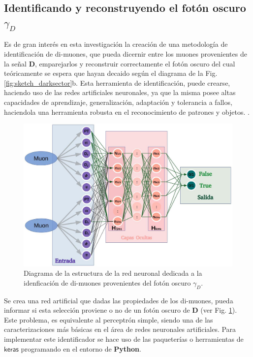 \subsection{Identificando y reconstruyendo el fotón oscuro $\gamma_D$}

Es de gran interés en esta investigación la creación de una metodología de identificación de di-muones, que pueda dicernir entre los muones provenientes de la señal \MSSM\textbf{D}, emparejarlos y reconstruir correctamente el fotón oscuro del cual teóricamente se espera que hayan decaido según el diagrama de la Fig. \ref{fig:sketch_darksector}b. Esta herramienta de identificación, puede crearse, haciendo uso de las redes artificiales neuronales, ya que la misma posee altas capacidades de aprendizaje, generalización, adaptación y tolerancia a fallos, haciendola una herramienta robusta en el reconocimiento de patrones y objetos.     .

\begin{figure}[!h]
\centering
\includegraphics[width=.9\textwidth]{Simulacion/imagenes/IDENTIFICADOR.png}
\caption{Diagrama de la estructura de la red neuronal dedicada a la idenficación de di-muones provenientes del fotón oscuro $\gamma_D$.}
\label{identificador}
\end{figure}

Se crea una red artificial que dadas las propiedades de los di-muones, pueda informar si esta selección proviene o no de un fotón oscuro de \MSSM\textbf{D} (ver Fig. \ref{identificador}). Este problema, es equivalente al perceptrón simple, siendo una de las caracterizaciones más básicas en el área de redes neuronales artificiales.
Para implementar este identificador se hace uso de las paqueterías o herramientas de $\textsf{keras}$ programando en el entorno de \textbf{Python}.

